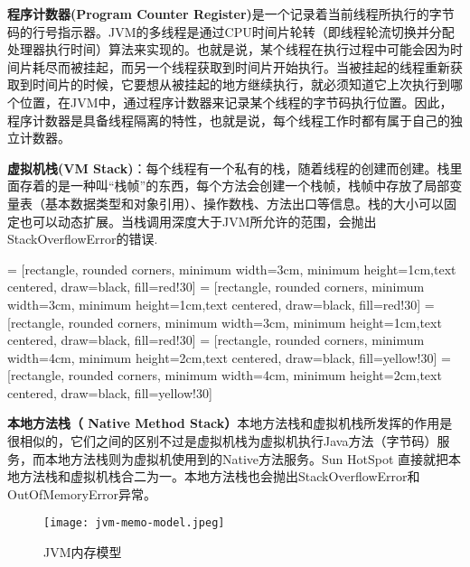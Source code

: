 \documentclass[../../../interview-questions.tex]{subfiles}
\begin{document}
\textbf{程序计数器(Program Counter Register)}是一个记录着当前线程所执行的字节码的行号指示器。JVM的多线程是通过CPU时间片轮转（即线程轮流切换并分配处理器执行时间）算法来实现的。也就是说，某个线程在执行过程中可能会因为时间片耗尽而被挂起，而另一个线程获取到时间片开始执行。当被挂起的线程重新获取到时间片的时候，它要想从被挂起的地方继续执行，就必须知道它上次执行到哪个位置，在JVM中，通过程序计数器来记录某个线程的字节码执行位置。因此，程序计数器是具备线程隔离的特性，也就是说，每个线程工作时都有属于自己的独立计数器。

\textbf{虚拟机栈(VM Stack)}：每个线程有一个私有的栈，随着线程的创建而创建。栈里面存着的是一种叫“栈帧”的东西，每个方法会创建一个栈帧，栈帧中存放了局部变量表（基本数据类型和对象引用）、操作数栈、方法出口等信息。栈的大小可以固定也可以动态扩展。当栈调用深度大于JVM所允许的范围，会抛出StackOverflowError的错误.

 = [rectangle, rounded corners, minimum width=3cm, minimum height=1cm,text centered, draw=black, fill=red!30]
 = [rectangle, rounded corners, minimum width=3cm, minimum height=1cm,text centered, draw=black, fill=red!30]
 = [rectangle, rounded corners, minimum width=3cm, minimum height=1cm,text centered, draw=black, fill=red!30]
 = [rectangle, rounded corners, minimum width=4cm, minimum height=2cm,text centered, draw=black, fill=yellow!30]
 = [rectangle, rounded corners, minimum width=4cm, minimum height=2cm,text centered, draw=black, fill=yellow!30]

\textbf{本地方法栈（ Native Method Stack）}本地方法栈和虚拟机栈所发挥的作用是很相似的，它们之间的区别不过是虚拟机栈为虚拟机执行Java方法（字节码）服务，而本地方法栈则为虚拟机使用到的Native方法服务。Sun HotSpot 直接就把本地方法栈和虚拟机栈合二为一。本地方法栈也会抛出StackOverflowError和OutOfMemoryError异常。

\begin{figure}[htbp]
	\centering
	\texttt{[image: jvm-memo-model.jpeg]}
	\caption{JVM内存模型}
	\label{fig:collection1}
\end{figure}
\end{document}
